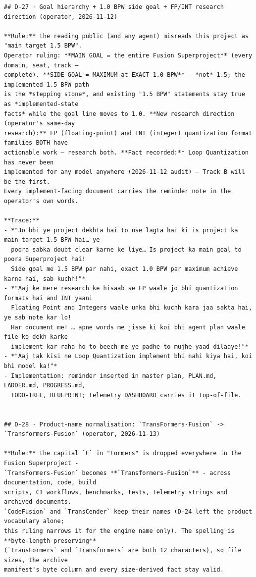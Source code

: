 \begin{verbatim}
## D-27 · Goal hierarchy + 1.0 BPW side goal + FP/INT research direction (operator, 2026-11-12)

**Rule:** the reading public (and any agent) misreads this project as "main target 1.5 BPW".
Operator ruling: **MAIN GOAL = the entire Fusion Superproject** (every domain, seat, track —
complete). **SIDE GOAL = MAXIMUM at EXACT 1.0 BPW** — *not* 1.5; the implemented 1.5 BPW path
is the *stepping stone*, and existing "1.5 BPW" statements stay true as *implemented-state
facts* while the goal line moves to 1.0. **New research direction (operator's same-day
research):** FP (floating-point) and INT (integer) quantization format families BOTH have
actionable work — research both. **Fact recorded:** Loop Quantization has never been
implemented for any model anywhere (2026-11-12 audit) — Track B will be the first.
Every implement-facing document carries the reminder note in the operator's own words.

**Trace:**
- *"Jo bhi ye project dekhta hai to use lagta hai ki is project ka main target 1.5 BPW hai… ye
  poora sabka doubt clear karne ke liye… Is project ka main goal to poora Superproject hai!
  Side goal me 1.5 BPW par nahi, exact 1.0 BPW par maximum achieve karna hai, sab kuchh!"*
- *"Aaj ke mere research ke hisaab se FP waale jo bhi quantization formats hai and INT yaani
  Floating Point and Integers waale unka bhi kuchh kara jaa sakta hai, ye sab note kar lo!
  Har document me! … apne words me jisse ki koi bhi agent plan waale file ko dekh karke
  implement kar raha ho to beech me ye padhe to mujhe yaad dilaaye!"*
- *"Aaj tak kisi ne Loop Quantization implement bhi nahi kiya hai, koi bhi model ka!"*
- Implementation: reminder inserted in master plan, PLAN.md, LADDER.md, PROGRESS.md,
  TODO-TREE, BLUEPRINT; telemetry DASHBOARD carries it top-of-file.


## D-28 · Product-name normalisation: `TransFormers-Fusion` -> `Transformers-Fusion` (operator, 2026-11-13)

**Rule:** the capital `F` in "Formers" is dropped everywhere in the Fusion Superproject -
`TransFormers-Fusion` becomes **`Transformers-Fusion`** - across documentation, code, build
scripts, CI workflows, benchmarks, tests, telemetry strings and archived documents.
`CodeFusion` and `TransCender` keep their names (D-24 left the product vocabulary alone;
this ruling narrows it for the engine name only). The spelling is **byte-length preserving**
(`TransFormers` and `Transformers` are both 12 characters), so file sizes, the archive
manifest's byte column and every size-derived fact stay valid.


\end{verbatim}
